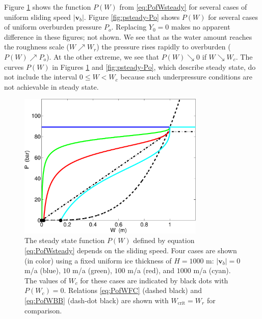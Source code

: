 \documentclass[11pt,final]{amsart}
\newcommand\bv{\mathbf{v}}
\begin{document}
\newcommand{\upto}{ \!\!\nearrow\! }
\newcommand{\downto}{ \!\searrow\! }
Figure \ref{fig:psteady-vb} shows the function $P(W)$ from \eqref{eq:PofWsteady} for several cases of uniform sliding speed $|\bv_b|$.  Figure \ref{fig:psteady-Po} shows $P(W)$ for several cases of uniform overburden pressure $P_o$.  Replacing $Y_0=0$ makes no apparent difference in these figures; not shown.  We see that as the water amount reaches the roughness scale ($W\upto W_r$) the pressure rises rapidly to overburden ($P(W) \upto P_o$).  At the other extreme, we see that $P(W) \downto 0$ if $W \downto W_c$.  The curves $P(W)$ in Figures \ref{fig:psteady-vb} and \ref{fig:psteady-Po}, which describe steady state, do not include the interval $0\le W < W_c$ because such underpressure conditions are not achievable in steady state.

\begin{figure}[ht]
\includegraphics[width=3.5in,keepaspectratio=true]{psteady-vb}
\medskip
\caption{The steady state function $P(W)$ defined by equation \eqref{eq:PofWsteady} depends on the sliding speed.  Four cases are shown (in color) using a fixed uniform ice thickness of $H=1000$ m: $|\bv_b|=0$ m/a (blue), $10$ m/a (green), $100$ m/a (red), and $1000$ m/a (cyan).  The values of $W_c$ for these cases are indicated by black dots with $P(W_c)=0$.  Relations \eqref{eq:PofWFC} (dashed black) and \eqref{eq:PofWBB} (dash-dot black) are shown with $W_{\text{crit}}=W_r$ for comparison.}
\label{fig:psteady-vb}
\end{figure}
\end{document}
